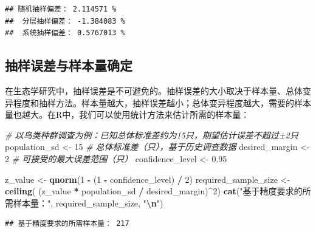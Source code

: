 \documentclass[
  twoside,12pt,fontset=none]{ctexbook}
\newenvironment{Shaded}{\begin{snugshade}}{\end{snugshade}}
\newcommand{\CommentTok}[1]{\textcolor[rgb]{0.56,0.35,0.01}{\textit{#1}}}
\newcommand{\DecValTok}[1]{\textcolor[rgb]{0.00,0.00,0.81}{#1}}
\newcommand{\FloatTok}[1]{\textcolor[rgb]{0.00,0.00,0.81}{#1}}
\newcommand{\FunctionTok}[1]{\textcolor[rgb]{0.13,0.29,0.53}{\textbf{#1}}}
\newcommand{\NormalTok}[1]{#1}
\newcommand{\OtherTok}[1]{\textcolor[rgb]{0.56,0.35,0.01}{#1}}
\newcommand{\SpecialCharTok}[1]{\textcolor[rgb]{0.81,0.36,0.00}{\textbf{#1}}}
\newcommand{\StringTok}[1]{\textcolor[rgb]{0.31,0.60,0.02}{#1}}
\begin{document}
\begin{verbatim}
## 随机抽样偏差： 2.114571 %
##  分层抽样偏差： -1.384083 %
##  系统抽样偏差： 0.5767013 %
\end{verbatim}

\hypertarget{ux62bdux6837ux8befux5deeux4e0eux6837ux672cux91cfux786eux5b9a}{%
\subsection{抽样误差与样本量确定}\label{ux62bdux6837ux8befux5deeux4e0eux6837ux672cux91cfux786eux5b9a}}

在生态学研究中，抽样误差是不可避免的。抽样误差的大小取决于样本量、总体变异程度和抽样方法。样本量越大，抽样误差越小；总体变异程度越大，需要的样本量也越大。在R中，我们可以使用统计方法来估计所需的样本量：

\begin{Shaded}
\begin{Highlighting}[]
\CommentTok{\# 以鸟类种群调查为例：已知总体标准差约为15只，期望估计误差不超过±2只}
\NormalTok{population\_sd }\OtherTok{\textless{}{-}} \DecValTok{15}   \CommentTok{\# 总体标准差（只），基于历史调查数据}
\NormalTok{desired\_margin }\OtherTok{\textless{}{-}} \DecValTok{2}   \CommentTok{\# 可接受的最大误差范围（只）}
\NormalTok{confidence\_level }\OtherTok{\textless{}{-}} \FloatTok{0.95}

\NormalTok{z\_value }\OtherTok{\textless{}{-}} \FunctionTok{qnorm}\NormalTok{(}\DecValTok{1} \SpecialCharTok{{-}}\NormalTok{ (}\DecValTok{1} \SpecialCharTok{{-}}\NormalTok{ confidence\_level) }\SpecialCharTok{/} \DecValTok{2}\NormalTok{)}
\NormalTok{required\_sample\_size }\OtherTok{\textless{}{-}} \FunctionTok{ceiling}\NormalTok{(}
\NormalTok{  (z\_value }\SpecialCharTok{*}\NormalTok{ population\_sd }\SpecialCharTok{/}\NormalTok{ desired\_margin)}\SpecialCharTok{\^{}}\DecValTok{2}\NormalTok{)}
\FunctionTok{cat}\NormalTok{(}\StringTok{"基于精度要求的所需样本量："}\NormalTok{, required\_sample\_size, }\StringTok{"}\SpecialCharTok{\textbackslash{}n}\StringTok{"}\NormalTok{)}
\end{Highlighting}
\end{Shaded}

\begin{verbatim}
## 基于精度要求的所需样本量： 217
\end{verbatim}
\end{document}
